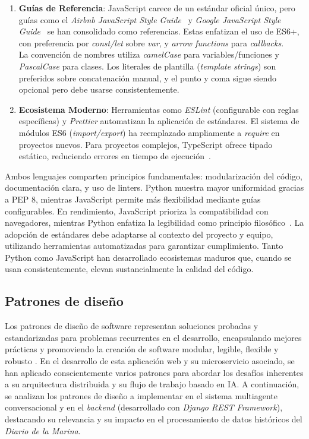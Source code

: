 \begin{enumerate}
	\item \textbf{Guías de Referencia}: JavaScript carece de un estándar oficial único, pero guías como el \textit{Airbnb JavaScript Style Guide}~\cite{AirbnbJS} y \textit{Google JavaScript Style Guide}~\cite{GoogleJS} se han consolidado como referencias. Estas enfatizan el uso de ES6+, con preferencia por \textit{const/let} sobre \textit{var}, y \textit{arrow functions} para \textit{callbacks}.\\
	La convención de nombres utiliza \textit{camelCase} para variables/funciones y \textit{PascalCase} para clases. Los literales de plantilla (\textit{template strings}) son preferidos sobre concatenación manual, y el punto y coma sigue siendo opcional pero debe usarse consistentemente.
	\item \textbf{Ecosistema Moderno}: Herramientas como \textit{ESLint} (configurable con reglas específicas) y \textit{Prettier} automatizan la aplicación de estándares. El sistema de módulos ES6 (\textit{import/export}) ha reemplazado ampliamente a \textit{require} en proyectos nuevos. Para proyectos complejos, TypeScript ofrece tipado estático, reduciendo errores en tiempo de ejecución~\cite{TypeScript}.
\end{enumerate}

Ambos lenguajes comparten principios fundamentales: modularización del código, documentación clara, y uso de linters. Python muestra mayor uniformidad gracias a PEP 8, mientras JavaScript permite más flexibilidad mediante guías configurables. En rendimiento, JavaScript prioriza la compatibilidad con navegadores, mientras Python enfatiza la legibilidad como principio filosófico~\cite{PEP20}. La adopción de estándares debe adaptarse al contexto del proyecto y equipo, utilizando herramientas automatizadas para garantizar cumplimiento. Tanto Python como JavaScript han desarrollado ecosistemas maduros que, cuando se usan consistentemente, elevan sustancialmente la calidad del código.

\subsection{Patrones de diseño}
\label{sec:patrones_diseno}

Los patrones de diseño de software representan soluciones probadas y estandarizadas para problemas recurrentes en el desarrollo, encapsulando mejores prácticas y promoviendo la creación de software modular, legible, flexible y robusto \cite{gavilanez2022analisis}. En el desarrollo de esta aplicación web y su microservicio asociado, se han aplicado conscientemente varios patrones para abordar los desafíos inherentes a su arquitectura distribuida y su flujo de trabajo basado en IA. A continuación, se analizan los patrones de diseño a implementar en el sistema multiagente conversacional y en el \textit{backend} (desarrollado con \textit{Django REST Framework}), destacando su relevancia y su impacto en el procesamiento de datos históricos del \textit{Diario de la Marina}.

